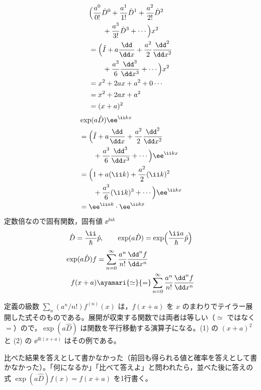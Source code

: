 \begin{align*}
&\Bigl(\frac{a^{0}}{0!}\hat{D}^{0}+\frac{a^{1}}{1!}\hat{D}^{1}+\frac{a^{2}}{2!}\hat{D}^{2}\\
&\qquad+\frac{a^{3}}{3!}\hat{D}^{3}+\cdots\Bigr)x^{2}\\
&=\Bigl(\hat{I}+a\frac{\dd}{\dd x}+\frac{a^{2}}{2}\frac{\dd^{2}}{\dd x^{2}}\\
&\qquad+\frac{a^{3}}{6}\frac{\dd^{3}}{\dd x^{3}}+\cdots\Bigr)x^{2}\\
&=x^{2}+2ax+a^{2}+0\cdots\\
&=x^{2}+2ax+a^{2}\\
&=(x+a)^{2}
\end{align*}
\begin{align*}
&\exp(a\hat{D})\ee^{\ii kx}\\
&=\Bigl(\hat{I}+a\frac{\dd}{\dd x}+\frac{a^{2}}{2}\frac{\dd^{2}}{\dd x^{2}}\\
&\qquad+\frac{a^{3}}{6}\frac{\dd^{3}}{\dd x^{3}}+\cdots\Bigr)\ee^{\ii kx}\\
&=\Bigl(1+a(\ii k)+\frac{a^{2}}{2}(\ii k)^{2}\\
&\qquad+\frac{a^{3}}{6}(\ii k)^{3}+\cdots\Bigr)\ee^{\ii kx}\\
&=\ee^{\ii ak}\cdot\ee^{\ii kx}
\end{align*}
定数倍なので固有関数，固有値 $\ee^{\ii ak}$
\[ \hat{D}=\frac{\ii}{\hbar}\hat{p},\qquad \exp(a\hat{D})=\exp\Bigl(\frac{\ii a}{\hbar}\hat{p}\Bigr) \]
\begin{align*}
\exp(a\hat{D})f&=\sum_{n=0}^{\infty}\frac{a^{n}}{n!}\frac{\dd^{n}f}{\dd x^{n}}\\
f(x+a)&\ayamari{\simeq}{=}\sum_{n=0}^{\infty}\frac{a^{n}}{n!}\frac{\dd^{n}f}{\dd x^{n}}
\end{align*}
 
\item 定義の級数 $\sum_{n}(a^{n}/n!)f^{(n)}(x)$ は，$f(x+a)$ を $x$ のまわりでテイラー展開した式そのものである。展開が収束する関数では両者は等しい（$\simeq$ ではなく $=$）ので，$\exp(a\hat{D})$ は関数を平行移動する演算子になる。(1) の $(x+a)^{2}$ と (2) の $\ee^{\ii k(x+a)}$ はその例である。
\item {} 比べた結果を答えとして書かなかった（前回も得られる値と確率を答えとして書かなかった）。「何になるか」「比べて答えよ」と問われたら，並べた後に答えの式 $\exp(a\hat{D})f(x)=f(x+a)$ を1行書く。
